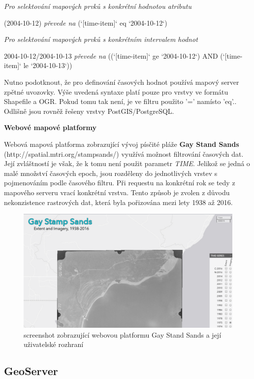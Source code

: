 \bigskip
\textit{Pro selektování mapových prvků s konkrétní hodnotou atributu} 

(2004-10-12) \textit{převede na} (`[time-item]` eq `2004-10-12`)

\textit{Pro selektování mapových prvků s konkrétním intervalem hodnot} 

2004-10-12/2004-10-13 \textit{převede na} ((`[time-item]` ge `2004-10-12`) AND (`[time-item]` le `2004-10-13`))

\bigskip
Nutno podotknout, že pro definování časových hodnot používá mapový server zpětné uvozovky. Výše uvedená syntaxe platí pouze pro vrstvy ve formátu Shapefile a OGR. Pokud tomu tak není, je ve filtru použito '=' namísto 'eq'.\cite{mapserver_about}. Odlišně jsou rovněž řešeny vrstvy PostGIS/PostgreSQL. 

\bigskip
\noindent
\textbf{Webové mapové platformy}

Webová mapová platforma zobrazující vývoj písčité pláže \textbf{Gay Stand Sands} (http://spatial.mtri.org/stampsands/) využívá možnost filtrování časových dat. Její zvláštností je však, že k tomu není použit parametr \textit{TIME}. Jelikož se jedná o malé množství časových epoch, jsou rozděleny do jednotlivých vrstev s pojmenováním podle časového filtru. Při requestu na konkrétní rok se tedy z mapového serveru vrací konkrétní vrstva. Tento způsob je zvolen z důvodu nekonzistence rastrových dat, která byla pořizována mezi lety 1938 až 2016.

\begin{figure}[h!]
	\centering
	\includegraphics[width=1\textwidth]{../img/gay-sands.png}
	\caption{screenshot zobrazující webovou platformu Gay Stand Sands a její uživatelské rozhraní}
	\label{fig:gay-sands}
\end{figure}

\newpage
\subsection{GeoServer}

